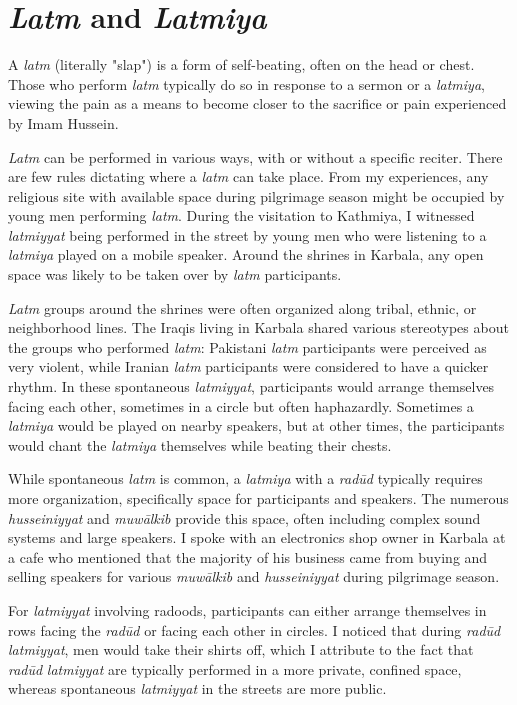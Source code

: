 \section{\emph{Latm} and \emph{Latmiya}}

A \emph{latm} (literally "slap") is a form of self-beating, often on the head or chest. Those who perform \emph{latm} typically do so in response to a sermon or a \emph{latmiya}, viewing the pain as a means to become closer to the sacrifice or pain experienced by Imam Hussein.

\emph{Latm} can be performed in various ways, with or without a specific reciter. There are few rules dictating where a \emph{latm} can take place. From my experiences, any religious site with available space during pilgrimage season might be occupied by young men performing \emph{latm}. During the visitation to Kathmiya, I witnessed \emph{latmiyyat} being performed in the street by young men who were listening to a \emph{latmiya} played on a mobile speaker. Around the shrines in Karbala, any open space was likely to be taken over by \emph{latm} participants.

\emph{Latm} groups around the shrines were often organized along tribal, ethnic, or neighborhood lines. The Iraqis living in Karbala shared various stereotypes about the groups who performed \emph{latm}: Pakistani \emph{latm} participants were perceived as very violent, while Iranian \emph{latm} participants were considered to have a quicker rhythm. In these spontaneous \emph{latmiyyat}, participants would arrange themselves facing each other, sometimes in a circle but often haphazardly. Sometimes a \emph{latmiya} would be played on nearby speakers, but at other times, the participants would chant the \emph{latmiya} themselves while beating their chests.

While spontaneous \emph{latm} is common, a \emph{latmiya} with a \emph{radūd} typically requires more organization, specifically space for participants and speakers. The numerous \emph{husseiniyyat} and \emph{muwālkib} provide this space, often including complex sound systems and large speakers. I spoke with an electronics shop owner in Karbala at a cafe who mentioned that the majority of his business came from buying and selling speakers for various \emph{muwālkib} and \emph{husseiniyyat} during pilgrimage season.

For \emph{latmiyyat} involving radoods, participants can either arrange themselves in rows facing the \emph{radūd} or facing each other in circles. I noticed that during \emph{radūd} \emph{latmiyyat}, men would take their shirts off, which I attribute to the fact that \emph{radūd} \emph{latmiyyat} are typically performed in a more private, confined space, whereas spontaneous \emph{latmiyyat} in the streets are more public.

